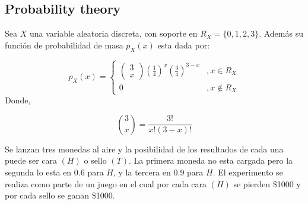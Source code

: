 \documentclass[11pt]{exam}
\begin{document}
%
%
%
\begin{questions}
\section*{Probability theory}
\addpoints
\question[5] Sea $X$ una variable aleatoria discreta, con soporte en $R_X = \{0,1,2,3\}$. Adem\'as su funci\'on de probabilidad de masa $p_X(x)$ esta dada por:

\begin{equation}
p_X(x)=\left\{\begin{matrix}
\begin{pmatrix}
3\\ 
x
\end{pmatrix} \left (\frac{1}{4}  \right )^x \left (\frac{3}{4}  \right )^{3-x}&  , x \in R_X\\ 
0 & , x \notin R_X
\end{matrix}\right.
\end{equation}
Donde,

\begin{equation}
\binom{3}{x}=\frac{3!}{x!\left ( 3-x \right )!}
\end{equation}



\question Se lanzan tres monedas al aire y la posibilidad de los resultados de cada una puede ser cara $(H)$ o sello $(T)$. La primera moneda no esta cargada pero la segunda lo esta en $0.6$ para $H$, y la tercera en 0.9 para $H$. El experimento se realiza como parte de un juego en el cual por cada cara $(H)$ se pierden \$1000 y por cada sello se ganan \$1000.

\end{questions}
\end{document}
